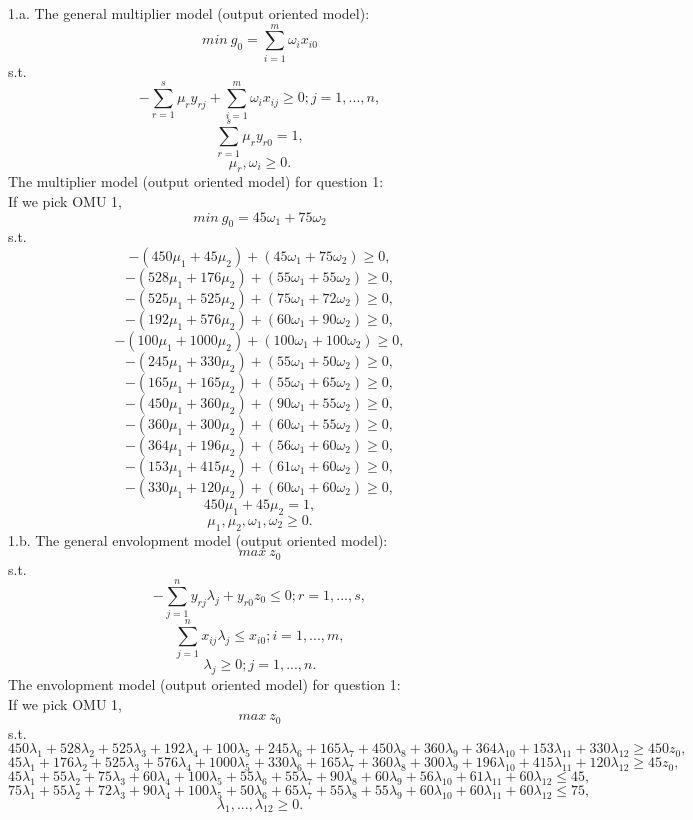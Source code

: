 \documentclass{article}
\begin{document}
1.a.
The general multiplier model (output oriented model):
$$ min\ g_0 = \sum_{i=1}^m \omega_i x_{i0} $$
s.t.
$$ - \sum_{r=1}^s \mu_r y_{rj} + \sum_{i=1}^m \omega_i x_{ij} \geq 0; j = 1, ..., n, $$
$$ \sum_{r=1}^s \mu_r y_{r0} = 1, $$
$$ \mu_r, \omega_i \geq 0. $$
The multiplier model (output oriented model) for question 1: \\
If we pick OMU 1,
$$ min\ g_0 = 45 \omega_1 + 75 \omega_2 $$
s.t.
$$ - (450 \mu_1 + 45 \mu_2) + (45 \omega_1 + 75 \omega_2) \geq 0, $$
$$ - (528 \mu_1 + 176 \mu_2) + (55 \omega_1 + 55 \omega_2) \geq 0, $$
$$ - (525 \mu_1 + 525 \mu_2) + (75 \omega_1 + 72 \omega_2) \geq 0, $$
$$ - (192 \mu_1 + 576 \mu_2) + (60 \omega_1 + 90 \omega_2) \geq 0, $$
$$ - (100 \mu_1 + 1000 \mu_2) + (100 \omega_1 + 100 \omega_2) \geq 0, $$
$$ - (245 \mu_1 + 330 \mu_2) + (55 \omega_1 + 50 \omega_2) \geq 0, $$
$$ - (165 \mu_1 + 165 \mu_2) + (55 \omega_1 + 65 \omega_2) \geq 0, $$
$$ - (450 \mu_1 + 360 \mu_2) + (90 \omega_1 + 55 \omega_2) \geq 0, $$
$$ - (360 \mu_1 + 300 \mu_2) + (60 \omega_1 + 55 \omega_2) \geq 0, $$
$$ - (364 \mu_1 + 196 \mu_2) + (56 \omega_1 + 60 \omega_2) \geq 0, $$
$$ - (153 \mu_1 + 415 \mu_2) + (61 \omega_1 + 60 \omega_2) \geq 0, $$
$$ - (330 \mu_1 + 120 \mu_2) + (60 \omega_1 + 60 \omega_2) \geq 0, $$
$$ 450 \mu_1 + 45 \mu_2 = 1, $$
$$ \mu_1, \mu_2, \omega_1, \omega_2 \geq 0. $$
1.b.
The general envolopment model (output oriented model):
$$ max\ z_0 $$
s.t.
$$ - \sum_{j = 1}^n y_{rj} \lambda_j + y_{r0} z_0 \leq 0; r = 1, ..., s, $$
$$ \sum_{j=1}^n x_{ij} \lambda_j \leq x_{i0}; i = 1, ..., m, $$
$$ \lambda_j \geq 0; j = 1, ..., n. $$
The envolopment model (output oriented model) for question 1: \\
If we pick OMU 1,
$$ max\ z_0 $$
s.t.
$$ 450 \lambda_1 + 528 \lambda_2 + 525 \lambda_3 + 192 \lambda_4 + 100 \lambda_5 + 245 \lambda_6 + 165 \lambda_7 + 450 \lambda_8 + 360 \lambda_9 + 364 \lambda_{10} + 153 \lambda_{11} + 330 \lambda_{12} \geq 450 z_0, $$
$$ 45 \lambda_1 + 176 \lambda_2 + 525 \lambda_3 + 576 \lambda_4 + 1000 \lambda_5 + 330 \lambda_6 + 165 \lambda_7 + 360 \lambda_8 + 300 \lambda_9 + 196 \lambda_{10} + 415 \lambda_{11} + 120 \lambda_{12} \geq 45 z_0, $$
$$ 45 \lambda_1 + 55 \lambda_2 + 75 \lambda_3 + 60 \lambda_4 + 100 \lambda_5 + 55 \lambda_6 + 55 \lambda_7 + 90 \lambda_8 + 60 \lambda_9 + 56 \lambda_{10} + 61 \lambda_{11} + 60 \lambda_{12} \leq 45, $$
$$ 75 \lambda_1 + 55 \lambda_2 + 72 \lambda_3 + 90 \lambda_4 + 100 \lambda_5 + 50 \lambda_6 + 65 \lambda_7 + 55 \lambda_8 + 55 \lambda_9 + 60 \lambda_{10} + 60 \lambda_{11} + 60 \lambda_{12} \leq 75, $$
$$ \lambda_1, ..., \lambda_{12} \geq 0. $$
\end{document}
